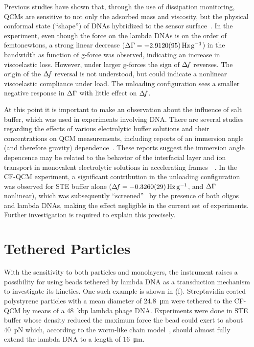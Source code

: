 Previous studies have shown that, through the use of dissipation
monitoring, QCMs are sensitive to not only the adsorbed mass and viscosity,
but the physical conformal state (``shape'') of DNAs hybridized to the
sensor surface~\cite{tsortos2008shear}.  In the experiment, even though the
force on the lambda DNAs is on the order of femtonewtons, a strong linear
decrease ($\dg=\SI{-2.912+-0.0095}{\hertz\per\g}$) in the bandwidth as
function of g-force was observed, indicating an increase in viscoelastic
loss.  However, under larger g-forces the sign of $\Delta\!f$ reverses.  The
origin of the $\Delta\!f$ reversal is not understood, but could indicate a
nonlinear viscoelastic compliance under load.  The unloading configuration
sees a smaller negative response in $\Delta\Gamma$ with little effect on $\Delta\!f$.

At this point it is important to make an observation about the influence of
salt buffer, which was used in experiments involving DNA.  There are
several studies~\cite{encarnaccao2007influence}~\cite{lin1995role}
regarding the effects of various electrolytic buffer solutions and their
concentrations on QCM measurements, including reports of an immersion angle
(and therefore gravity) dependence~\cite{yoshimoto2006characteristics}.
These reports suggest the immersion angle depencence may be related to the
behavior of the interfacial layer and ion transport in monovalent
electrolytic solutions in accelerating
frames~\cite{tolman1911electromotive}~\cite{des1893unpolarisirbare}.  In
the CF-QCM experiment, a significant contribution in the unloading
configuration was observed for STE buffer alone
($\df=\SI{-0.326+-0.0029}{\hertz\per\g}$, and $\Delta\Gamma$ nonlinear), which was
subsequently ``screened''~\cite{zhang2002insulating} by the presence of
both oligos and lambda DNAs, making the effect negligible in the current
set of experiments.  Further investigation is required to explain this
precisely.

\section{Tethered Particles}
With the sensitivity to both particles and monolayers, the instrument
raises a possibility for using beads tethered by lambda DNA as a
transduction mechanism to investigate its kinetics.  One such example is
shown in (f).  Streptavidin coated polystyrene
particles with a mean diameter of \SI{24.8}{\micro\meter} were tethered to
the CF-QCM by means of a \SI{48}{kbp} lambda phage DNA.  Experiments were
done in STE buffer whose density reduced the maximum force the bead could
exert to about \SI{40}{\pico\newton} which, according to the worm-like
chain model~\cite{marko1995stretching}, should almost fully extend the
lambda DNA to a length of \SI{16}{\micro\meter}.

